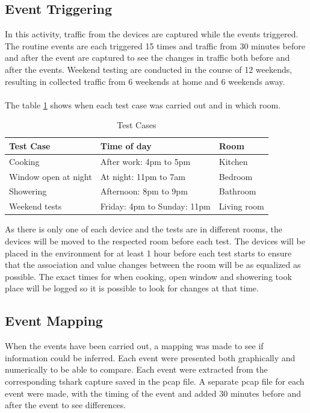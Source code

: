 \subsection{Event Triggering}
In this activity, traffic from the devices are captured while the events triggered. The routine events are each triggered 15 times and traffic from 30 minutes before and after the event are captured to see the changes in traffic both before and after the events. Weekend testing are conducted in the course of 12 weekends, resulting in collected traffic from 6 weekends at home and 6 weekends away. 
\\\\
The table \ref{tab:TestCases} shows when each test case was carried out and in which room. 
\begin{table}[H]
    \centering
    \caption{Test Cases}
    \begin{adjustbox}{width=1\textwidth}
    \begin{tabular}{| p{5cm} | p{5cm} | p{3cm} |} 
        \hline
        \textbf{Test Case} & \textbf{Time of day} & \textbf{Room} \\
        \hline
        Cooking & After work: 4pm to 5pm & Kitchen \\
        \hline
        Window open at night & At night: 11pm to 7am & Bedroom\\
        \hline
        Showering & Afternoon: 8pm to 9pm & Bathroom \\
        \hline
        Weekend tests & Friday: 4pm to Sunday: 11pm & Living room \\
        \hline
    \end{tabular}
    \end{adjustbox}
    \label{tab:TestCases}
\end{table}

As there is only one of each device and the tests are in different rooms, the devices will be moved to the respected room before each test. The devices will be placed in the environment for at least 1 hour before each test starts to ensure that the association and value changes between the room will be as equalized as possible. The exact times for when cooking, open window and showering took place will be logged so it is possible to look for changes at that time. 

\subsection{Event Mapping}
When the events have been carried out, a mapping was made to see if information could be inferred. Each event were presented both graphically and numerically to be able to compare. Each event were extracted from the corresponding tshark capture saved in the pcap file. A separate pcap file for each event were made, with the timing of the event and added 30 minutes before and after the event to see differences. 

